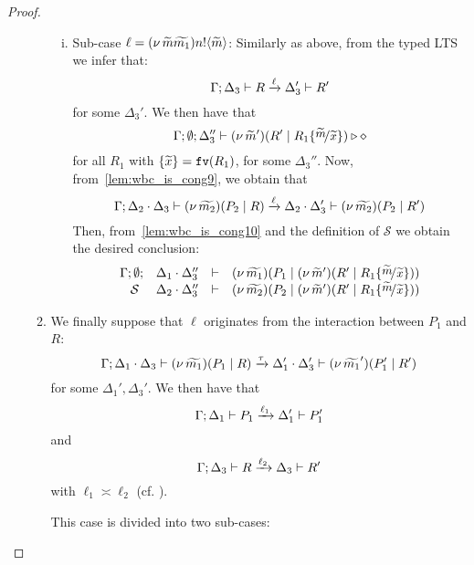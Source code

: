 \begin{proof}
\begin{enumerate}[I.]
\begin{enumerate}[1.]
\begin{enumerate}[i.]
				\item	Sub-case $\ell = (\nu\, \widetilde{m}\widetilde{m_1}) n ! \langle \widetilde{m} \rangle$: Similarly as above, 
						from the typed LTS we infer that:
					\begin{equation}
					\Gamma; \Delta_3 \vdash R \xrightarrow{\ell} \Delta_3' \vdash R'
							\label{lem:wbc_is_cong9}
							\end{equation}
							for some $\Delta_3'$. We then have that 
				\begin{equation}
				\Gamma; \emptyset; \Delta_3'' \proves \newsp{\widetilde{m}'}{R' \Par R_1 \subst{\widetilde{m}}{\widetilde{x}}} \hastype \Proc
							\label{lem:wbc_is_cong10}
					\end{equation}
					 for all $R_1$ with $\{\widetilde{x}\} = \mathtt{fv}(R_1)$, for some $\Delta_3''$.
				Now, from~\eqref{lem:wbc_is_cong9}, we obtain that
					\[
						\Gamma; \Delta_2 \cdot \Delta_3 \vdash (\nu\, \widetilde{m_2})(P_2 \;|\; R) \xrightarrow{\ell} \Delta_2 \cdot \Delta_3' \vdash (\nu\, \widetilde{m_2})(P_2 \;|\; R')
					\]
					Then, from~\eqref{lem:wbc_is_cong10} and the definition of $\mathcal{S}$ we obtain the desired conclusion:
					\[
						\mhorel{\Gamma}{\Delta_1 \cat \Delta_3''}{\newsp{\widetilde{m_1}}{P_1 \Par \newsp{\widetilde{m}'}{R' \Par R_1 \subst{\widetilde{m}}{\widetilde{x}}}}}
						{\ \mathcal{S}\ }
						{\Delta_2 \cat \Delta_3''}{}{\newsp{\widetilde{m_2}}{P_2 \Par \newsp{\widetilde{m}'}{R' \Par R_1 \subst{\widetilde{m}}{\widetilde{x}}}}}
					\]
			\end{enumerate}


	\item We finally suppose that $\ell$ originates from the interaction between $P_1$ and $R$:
			\[
				\Gamma; \Delta_1 \cdot \Delta_3 \vdash (\nu\, \widetilde{m_1})(P_1 \;|\; R) \xrightarrow{\tau} \Delta_1' \cdot \Delta_3' \vdash (\nu\, \widetilde{m_1}')(P_1' \;|\; R')
			\]
			for some $\Delta_1', \Delta_3'$. We then have that 
			$$\Gamma; \Delta_1 \vdash P_1 \xrightarrow{\ell_1} \Delta_1' \vdash P_1'$$
			and 
			\begin{equation}
			\Gamma; \Delta_3 \vdash R \xrightarrow{\ell_2} \Delta_3 \vdash R'
			\label{lem:wbc_is_cong11}
			\end{equation}
			with $\ell_1 \asymp \ell_2$ (cf. ). 
			
			This case is divided into two sub-cases:

			\begin{enumerate}[i.]


\end{enumerate}
\end{enumerate}
\end{enumerate}
\end{proof}
